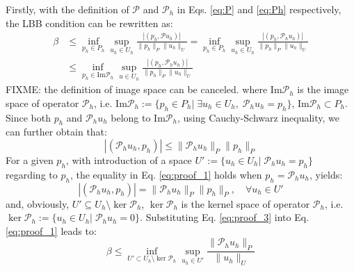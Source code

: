 \begin{pf}
Firstly, with the definition of $\mathcal P$ and $\mathcal P_h$ in Eqs. \eqref{eq:P} and \eqref{eq:Ph} respectively, the LBB condition can be rewritten as:
\begin{equation}\label{eq:proof_1}
    \begin{aligned}
        \beta &\leq \inf_{p_h \in P_h} \sup_{u_h \in U_h} \frac{|(p_h,\mathcal P u_h)|}{\| p_h \|_P\| u_h \|_U} = \inf_{p_h \in P_h} \sup_{u_h \in U_h} \frac{|(p_h,\mathcal P_h u_h)|}{\| p_h \|_P\| u_h \|_U} \\
        &\leq \inf_{p_h \in \mathrm{Im} \mathcal P_h} \sup_{u \in U_h} \frac{|(p_h,\mathcal P_h u_h)|}{\| p_h \|_P\| u_h \|_U}
    \end{aligned}
\end{equation}
FIXME: the definition of image space can be canceled.
where $\mathrm{Im} \mathcal P_h$ is the image space of operator $\mathcal P_h$, i.e. $\mathrm{Im} \mathcal P_h := \{p_h \in P_h |\; \exists u_h \in U_h,\; \mathcal P_h u_h = p_h \}$, $\mathrm{Im} \mathcal P_h \subset P_h$.
Since both $p_h$ and $\mathcal P_h u_h$ belong to $\mathrm{Im} \mathcal P_h$, using Cauchy-Schwarz inequality, we can further obtain that:
\begin{equation}\label{eq:proof_2}
|(\mathcal P_h u_h,p_h)| \leq \| \mathcal P_h u_h \|_P \| p_h \|_P
\end{equation}
For a given $p_h$, with introduction of a space $U' := \{ u_h \in U_h |\; \mathcal P_h u_h = p_h \}$ regarding to $p_h$, the equality in Eq. \eqref{eq:proof_1} holds when $p_h = \mathcal P_h u_h$, yields:
\begin{equation}\label{eq:proof_3}
    |(\mathcal P_h u_h,p_h)| = \| \mathcal P_h u_h \|_P \| p_h \|_P, \quad \forall u_h \in U'
\end{equation}
and, obviously, $U' \subseteq U_h\setminus \ker \mathcal P_h$, $\ker \mathcal P_h$ is the kernel space of operator $\mathcal P_h$, i.e. $\ker \mathcal P_h := \{ u_h \in U_h |\; \mathcal P_h u_h = 0 \}$.
Substituting Eq. \eqref{eq:proof_3} into Eq. \eqref{eq:proof_1} leads to:
\begin{equation}\label{eq:proof_4}
    \beta \leq \inf_{U' \subset U_h\setminus \ker \mathcal P_h} \sup_{u_h \in U'} \frac{\| \mathcal P_h u_h \|_P}{\| u_h \|_U}
\end{equation}


\end{pf}
